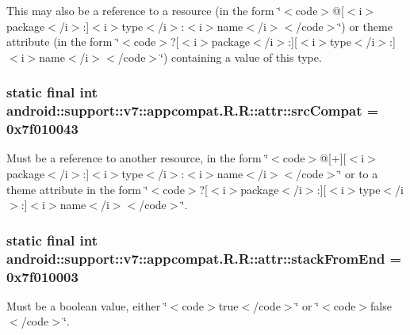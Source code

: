 This may also be a reference to a resource (in the form \char`\"{}$<$code$>$@\mbox{[}$<$i$>$package$<$/i$>$:\mbox{]}$<$i$>$type$<$/i$>$:$<$i$>$name$<$/i$>$$<$/code$>$\char`\"{}) or theme attribute (in the form \char`\"{}$<$code$>$?\mbox{[}$<$i$>$package$<$/i$>$:\mbox{]}\mbox{[}$<$i$>$type$<$/i$>$:\mbox{]}$<$i$>$name$<$/i$>$$<$/code$>$\char`\"{}) containing a value of this type. \hypertarget{classandroid_1_1support_1_1v7_1_1appcompat_1_1_r_1_1attr_7fe67edf594ad36a015103190d7a2c5d}{
\subsubsection[{srcCompat}]{\setlength{\rightskip}{0pt plus 5cm}static final int android::support::v7::appcompat.R.R::attr::srcCompat = 0x7f010043}}
\label{classandroid_1_1support_1_1v7_1_1appcompat_1_1_r_1_1attr_7fe67edf594ad36a015103190d7a2c5d}


Must be a reference to another resource, in the form \char`\"{}$<$code$>$@\mbox{[}+\mbox{]}\mbox{[}$<$i$>$package$<$/i$>$:\mbox{]}$<$i$>$type$<$/i$>$:$<$i$>$name$<$/i$>$$<$/code$>$\char`\"{} or to a theme attribute in the form \char`\"{}$<$code$>$?\mbox{[}$<$i$>$package$<$/i$>$:\mbox{]}\mbox{[}$<$i$>$type$<$/i$>$:\mbox{]}$<$i$>$name$<$/i$>$$<$/code$>$\char`\"{}. \hypertarget{classandroid_1_1support_1_1v7_1_1appcompat_1_1_r_1_1attr_caefa11e05fb3470024f37417e2c22e0}{
\subsubsection[{stackFromEnd}]{\setlength{\rightskip}{0pt plus 5cm}static final int android::support::v7::appcompat.R.R::attr::stackFromEnd = 0x7f010003}}
\label{classandroid_1_1support_1_1v7_1_1appcompat_1_1_r_1_1attr_caefa11e05fb3470024f37417e2c22e0}


Must be a boolean value, either \char`\"{}$<$code$>$true$<$/code$>$\char`\"{} or \char`\"{}$<$code$>$false$<$/code$>$\char`\"{}. 

